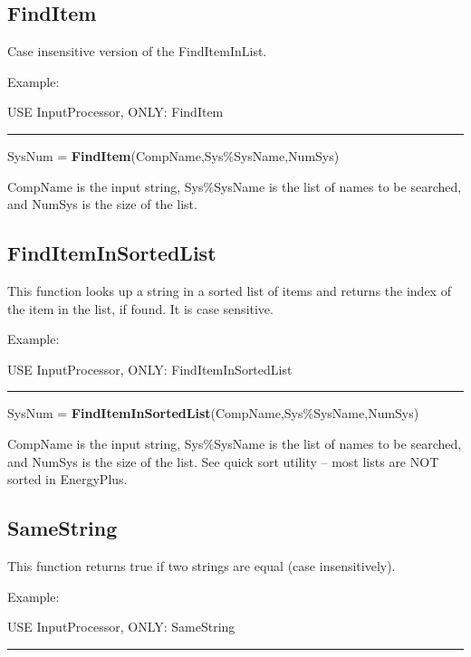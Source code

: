 \subsection{FindItem}\label{finditem}

Case insensitive version of the FindItemInList.

Example:

USE InputProcessor, ONLY: FindItem

\begin{center}\rule{0.5\linewidth}{0.4pt}\end{center}

SysNum = \textbf{FindItem}(CompName,Sys\%SysName,NumSys)

CompName is the input string, Sys\%SysName is the list of names to be searched, and NumSys is the size of the list.

\subsection{FindItemInSortedList}\label{finditeminsortedlist}

This function looks up a string in a sorted list of items and returns the index of the item in the list, if found. It is case sensitive.

Example:

USE InputProcessor, ONLY: FindItemInSortedList

\begin{center}\rule{0.5\linewidth}{0.4pt}\end{center}

SysNum = \textbf{FindItemInSortedList}(CompName,Sys\%SysName,NumSys)

CompName is the input string, Sys\%SysName is the list of names to be searched, and NumSys is the size of the list. See quick sort utility -- most lists are NOT sorted in EnergyPlus.

\subsection{SameString}\label{samestring}

This function returns true if two strings are equal (case insensitively).

Example:

USE InputProcessor, ONLY: SameString

\begin{center}\rule{0.5\linewidth}{0.4pt}\end{center}

